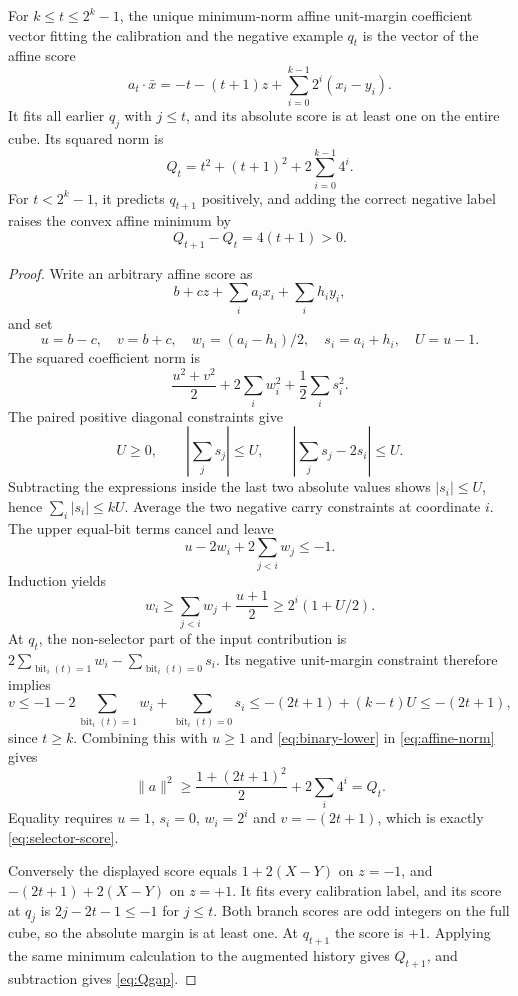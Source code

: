 \begin{lemma}\label{lem:selector}
For $k\le t\le2^k-1$, the unique minimum-norm affine unit-margin
coefficient vector fitting the calibration and the negative example
$q_t$ is the vector of the affine score
\begin{equation}\label{eq:selector-score}
 a_t\cdot\bar x=-t-(t+1)z+\sum_{i=0}^{k-1}2^i(x_i-y_i).
\end{equation}
It fits all earlier $q_j$ with $j\le t$, and its absolute score is at
least one on the entire cube. Its squared norm is
\begin{equation}\label{eq:Qt}
 Q_t=t^2+(t+1)^2+2\sum_{i=0}^{k-1}4^i.
\end{equation}
For $t<2^k-1$, it predicts $q_{t+1}$ positively, and adding the correct
negative label raises the convex affine minimum by
\begin{equation}\label{eq:Qgap}
 Q_{t+1}-Q_t=4(t+1)>0.
\end{equation}
\end{lemma}
\begin{proof}
Write an arbitrary affine score as
\[
 b+cz+\sum_i a_i x_i+\sum_i h_i y_i,
\]
and set
\[
 u=b-c,\quad v=b+c,\quad
 w_i=(a_i-h_i)/2,\quad s_i=a_i+h_i,\quad U=u-1.
\]
The squared coefficient norm is
\begin{equation}\label{eq:affine-norm}
 \frac{u^2+v^2}{2}+2\sum_iw_i^2+\frac12\sum_i s_i^2.
\end{equation}
The paired positive diagonal constraints give
\[
 U\ge0,\qquad \left|\sum_j s_j\right|\le U,\qquad
 \left|\sum_j s_j-2s_i\right|\le U.
\]
Subtracting the expressions inside the last two absolute values shows
$|s_i|\le U$, hence $\sum_i|s_i|\le kU$.
Average the two negative carry constraints at coordinate $i$. The upper
equal-bit terms cancel and leave
\[
 u-2w_i+2\sum_{j<i}w_j\le-1.
\]
Induction yields
\begin{equation}\label{eq:binary-lower}
 w_i\ge\sum_{j<i}w_j+\frac{u+1}{2}
       \ge2^i(1+U/2).
\end{equation}
At $q_t$, the non-selector part of the input contribution is
$2\sum_{\operatorname{bit}_i(t)=1}w_i-
\sum_{\operatorname{bit}_i(t)=0}s_i$. Its negative unit-margin constraint
therefore implies
\[
 v\le-1-2\sum_{\operatorname{bit}_i(t)=1}w_i
            +\sum_{\operatorname{bit}_i(t)=0}s_i
   \le-(2t+1)+(k-t)U\le-(2t+1),
\]
since $t\ge k$. Combining this with $u\ge1$ and
\eqref{eq:binary-lower} in \eqref{eq:affine-norm} gives
\[
 \|a\|^2\ge\frac{1+(2t+1)^2}{2}+2\sum_i4^i=Q_t.
\]
Equality requires $u=1$, $s_i=0$, $w_i=2^i$ and $v=-(2t+1)$,
which is exactly \eqref{eq:selector-score}.

Conversely the displayed score equals $1+2(X-Y)$ on $z=-1$, and
$-(2t+1)+2(X-Y)$ on $z=+1$. It fits every calibration label, and its score
at $q_j$ is $2j-2t-1\le-1$ for $j\le t$. Both branch scores are odd
integers on the full cube, so the absolute margin is at least one.
At $q_{t+1}$ the score is $+1$. Applying the same minimum calculation
to the augmented history gives $Q_{t+1}$, and subtraction gives
\eqref{eq:Qgap}.
\end{proof}

